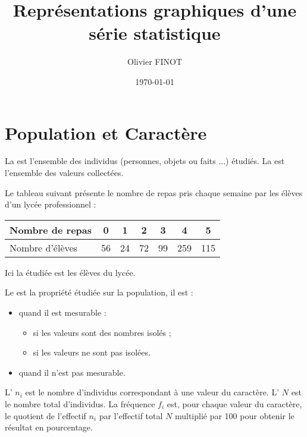 \documentclass[12pt,a4paper]{article}
\author{Olivier FINOT}
\date{\today}
\title{Représentations graphiques d'une série statistique }
\begin{document}
\maketitle

\section{Population et Caractère}

\begin{mydefs}
La  est l'ensemble des individus (personnes, objets ou faits ...) étudiés.
La  est l'ensemble des valeurs collectées.
\end{mydefs}


\begin{myex}
	
	Le tableau suivant présente le nombre de repas pris chaque semaine par les élèves d'un lycée professionnel :
	
	\begin{center}
		\begin{tabular}{|@{\ }l@{\ }|@{\ }c@{\ }|@{\ }c@{\ }|@{\ }c@{\ }|@{\ }c@{\ }|@{\ }c@{\ }|@{\ }c@{\ }|}
			\hline
			Nombre de repas & 0 & 1 & 2 & 3 & 4 & 5 \\ \hline
			Nombre d'élèves & 56 & 24 & 72 & 99 & 259 & 115 \\ \hline
		\end{tabular}
	\end{center}
	
	Ici la  étudiée est les élèves du lycée.
\end{myex}


\begin{mydefs}

Le  est la propriété étudiée sur la population, il est :
\begin{itemize}
	\item {} quand il est mesurable :
		\begin{itemize}
			\item {} si les valeurs sont des nombres isolés ;
			\item {} si les valeurs ne sont pas isolées. %
		\end{itemize}
	\item {} quand il n'est pas mesurable. %
\end{itemize}
\end{mydefs}


\begin{mydefs}
	L' $n_i$ est le nombre d'individus correspondant à une valeur du caractère. L' $N$ est le nombre total d'individus.
	La fréquence $f_i$ est, pour chaque valeur du caractère, le quotient de l'effectif $n_i$ par l'effectif total $N$ multiplié par 100 pour obtenir le résultat en pourcentage.
\end{mydefs}		
\end{document}
